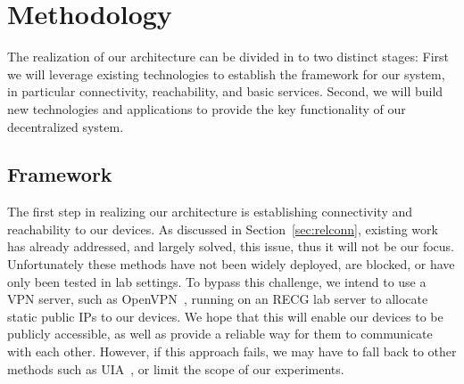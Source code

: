 \section{Methodology}
\label{Methodology}
The realization of our architecture can be divided in to two distinct stages: First we will leverage existing technologies to establish the framework for our system, in particular connectivity, reachability, and basic services.  
Second, we will build new technologies and applications to provide the key functionality of our decentralized system.

\subsection{Framework}
% 
The first step in realizing our architecture is establishing connectivity and reachability to our devices.
As discussed in Section~\ref{sec:relconn}, existing work has already addressed, and largely solved, this issue, thus it will not be our focus.
Unfortunately these methods have not been widely deployed, are blocked, or have only been tested in lab settings.
To bypass this challenge, we intend to use a VPN server, such as OpenVPN~\cite{feilner2006openvpn}, running on an RECG lab server to allocate static public IPs to our devices.
We hope that this will enable our devices to be publicly accessible, as well as provide a reliable way for them to communicate with each other.
However, if this approach fails, we may have to fall back to other methods such as UIA~\cite{ford2008uia,ford2006persistent}, or limit the scope of our experiments.

